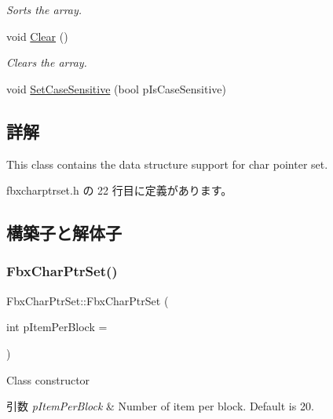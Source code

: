 \begin{DoxyCompactItemize}
$$\begin{DoxyCompactList}\small\item\em Sorts the array. \end{DoxyCompactList}\item 
void \hyperlink{class_fbx_char_ptr_set_a868b8f961a3e3f5d4c4c5f77009e5947}{Clear} ()
\begin{DoxyCompactList}\small\item\em Clears the array. \end{DoxyCompactList}\item 
void \hyperlink{class_fbx_char_ptr_set_ad7da280af4a52c6b7aa3037fd7636f6f}{Set\+Case\+Sensitive} (bool p\+Is\+Case\+Sensitive)
\end{DoxyCompactItemize}


\subsection{詳解}
This class contains the data structure support for char pointer set. 

 fbxcharptrset.\+h の 22 行目に定義があります。



\subsection{構築子と解体子}
\mbox{\label{class_fbx_char_ptr_set_a7f12f3a80a0e523ecb890aaa093c2aad}} 
\subsubsection{\texorpdfstring{Fbx\+Char\+Ptr\+Set()}{FbxCharPtrSet()}}
{\footnotesize\ttfamily Fbx\+Char\+Ptr\+Set\+::\+Fbx\+Char\+Ptr\+Set (\begin{DoxyParamCaption}\item[{int}]{p\+Item\+Per\+Block = {} }\end{DoxyParamCaption})}

Class constructor 
\begin{DoxyParams}{引数}
{\em p\+Item\+Per\+Block} & Number of item per block. Default is 20. \\
\hline
\end{DoxyParams}
\mbox{\label{class_fbx_char_ptr_set_adbdbfd04a21ccc2d880de34d74f96771}} 
